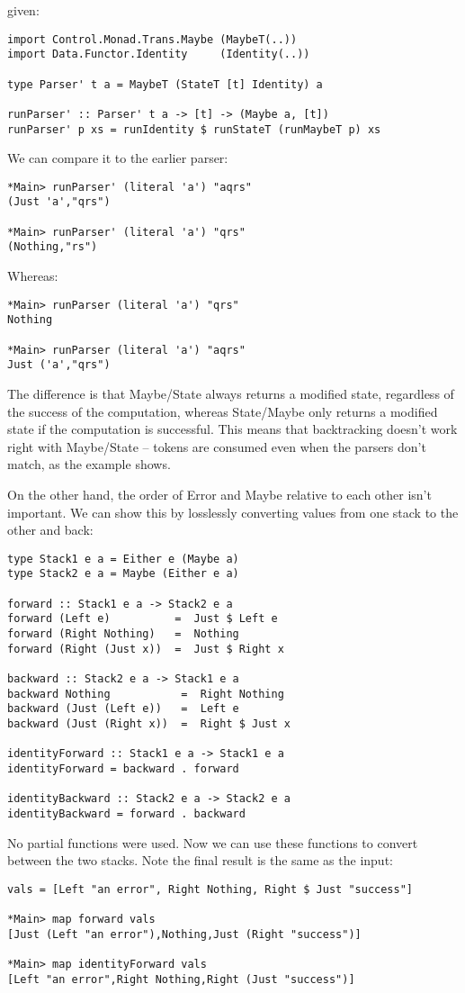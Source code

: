 \documentclass{tmr}
\begin{document}
given:
\begin{verbatim}
import Control.Monad.Trans.Maybe (MaybeT(..))
import Data.Functor.Identity     (Identity(..))

type Parser' t a = MaybeT (StateT [t] Identity) a

runParser' :: Parser' t a -> [t] -> (Maybe a, [t])
runParser' p xs = runIdentity $ runStateT (runMaybeT p) xs
\end{verbatim}

We can compare it to the earlier parser:
\begin{verbatim}
*Main> runParser' (literal 'a') "aqrs"
(Just 'a',"qrs")

*Main> runParser' (literal 'a') "qrs"
(Nothing,"rs")
\end{verbatim}
Whereas:
\begin{verbatim}
*Main> runParser (literal 'a') "qrs"
Nothing

*Main> runParser (literal 'a') "aqrs"
Just ('a',"qrs")
\end{verbatim}

The difference is that Maybe/State always returns a modified state, regardless
of the success of the computation, whereas State/Maybe only returns a modified
state if the computation is successful.  This means that backtracking doesn't
work right with Maybe/State -- tokens are consumed even when the parsers
don't match, as the example shows.

On the other hand, the order of Error and Maybe relative to each other isn't 
important.  We can show this by losslessly converting values from one stack to 
the other and back:
\begin{verbatim}
type Stack1 e a = Either e (Maybe a)
type Stack2 e a = Maybe (Either e a)

forward :: Stack1 e a -> Stack2 e a
forward (Left e)          =  Just $ Left e
forward (Right Nothing)   =  Nothing
forward (Right (Just x))  =  Just $ Right x

backward :: Stack2 e a -> Stack1 e a
backward Nothing           =  Right Nothing
backward (Just (Left e))   =  Left e
backward (Just (Right x))  =  Right $ Just x

identityForward :: Stack1 e a -> Stack1 e a
identityForward = backward . forward

identityBackward :: Stack2 e a -> Stack2 e a
identityBackward = forward . backward
\end{verbatim}

No partial functions were used.  Now we can use these functions to
convert between the two stacks.  Note the final result is the same as the input:
\begin{verbatim}
vals = [Left "an error", Right Nothing, Right $ Just "success"]

*Main> map forward vals
[Just (Left "an error"),Nothing,Just (Right "success")]

*Main> map identityForward vals
[Left "an error",Right Nothing,Right (Just "success")]
\end{verbatim}
\end{document}
